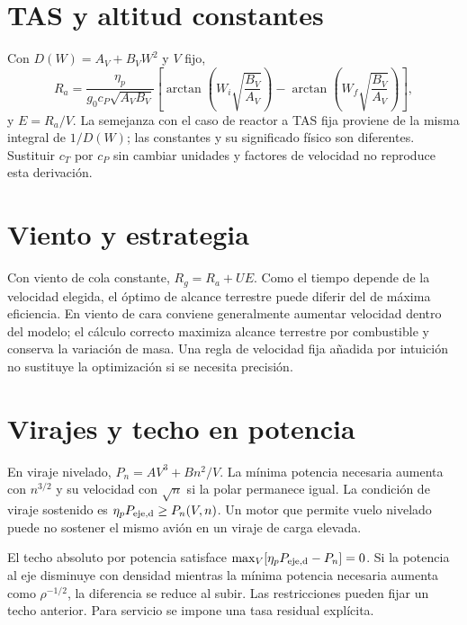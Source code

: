 \section{TAS y altitud constantes}
Con $D(W)=A_V+B_VW^2$ y $V$ fijo,
\begin{equation}
R_a=\frac{\eta_p}{g_0c_P\sqrt{A_VB_V}}
\left[\arctan\!\left(W_i\sqrt{\frac{B_V}{A_V}}\right)
-\arctan\!\left(W_f\sqrt{\frac{B_V}{A_V}}\right)\right],
\end{equation}
y $E=R_a/V$. La semejanza con el caso de reactor a TAS fija proviene de la misma integral de $1/D(W)$; las constantes y su significado físico son diferentes. Sustituir $c_T$ por $c_P$ sin cambiar unidades y factores de velocidad no reproduce esta derivación.

\section{Viento y estrategia}
Con viento de cola constante, $R_g=R_a+UE$. Como el tiempo depende de la velocidad elegida, el óptimo de alcance terrestre puede diferir del de máxima eficiencia. En viento de cara conviene generalmente aumentar velocidad dentro del modelo; el cálculo correcto maximiza alcance terrestre por combustible y conserva la variación de masa. Una regla de velocidad fija añadida por intuición no sustituye la optimización si se necesita precisión.

\section{Virajes y techo en potencia}
En viraje nivelado, $P_n=AV^3+Bn^2/V$. La mínima potencia necesaria aumenta con $n^{3/2}$ y su velocidad con $\sqrt n$ si la polar permanece igual. La condición de viraje sostenido es $\eta_pP_{\rm eje,d}\geq P_n(V,n)$. Un motor que permite vuelo nivelado puede no sostener el mismo avión en un viraje de carga elevada.

El techo absoluto por potencia satisface $\max_V[\eta_pP_{\rm eje,d}-P_n]=0$. Si la potencia al eje disminuye con densidad mientras la mínima potencia necesaria aumenta como $\rho^{-1/2}$, la diferencia se reduce al subir. Las restricciones pueden fijar un techo anterior. Para servicio se impone una tasa residual explícita.


